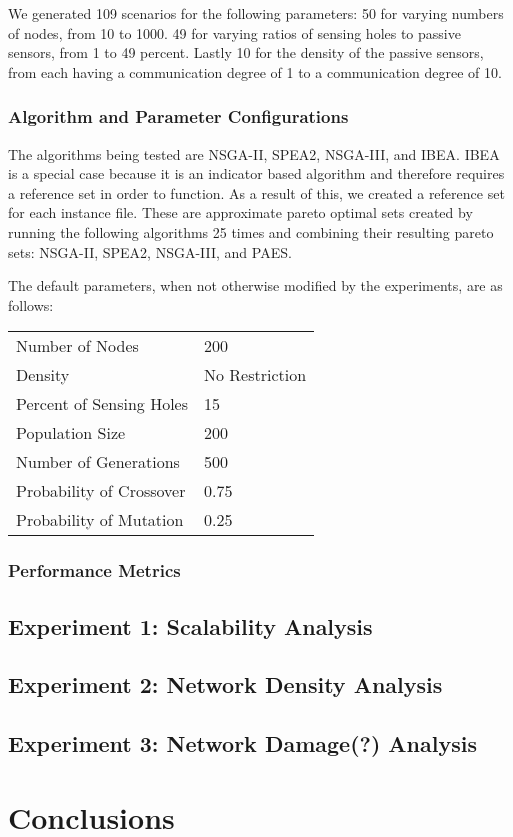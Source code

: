 \documentclass[conference]{IEEEtran}
\begin{document}
We generated 109 scenarios for the following parameters: 50 for varying numbers of nodes, from 10 to 1000. 49 for varying ratios of sensing holes to passive sensors, from 1 to 49 percent. Lastly 10 for the density of the passive sensors, from each having a communication degree of 1 to a communication degree of 10.

\subsubsection{Algorithm and Parameter Configurations}
\label{sec:Simulations:AlgorithmsAndParameters}
The algorithms being tested are NSGA-II\cite{Deb2002:NSGA-II}, SPEA2\cite{zitzler2001spea2}, NSGA-III\cite{6600851}, and IBEA\cite{zitzler2004indicator}. IBEA is a special case because it is an indicator based algorithm and therefore requires a reference set in order to function. As a result of this, we created a reference set for each instance file. These are approximate pareto optimal sets created by running the following algorithms 25 times and combining their resulting pareto sets: NSGA-II, SPEA2,  NSGA-III, and PAES\cite{knowles2000approximating}.

The default parameters, when not otherwise modified by the experiments, are as follows: 
\begin{table}[h]
\begin{tabular}{ll}
Number of Nodes &	200 \\
Density &  No Restriction \\
Percent of Sensing Holes & 15 \\
Population Size & 200 \\
Number of Generations &  500 \\
Probability of Crossover & 0.75 \\ 
Probability of Mutation & 0.25 \\
\end{tabular}
\end{table}

\subsubsection{Performance Metrics}
\label{sec:Experiments:Metrics}

\subsection{Experiment 1: Scalability Analysis}
\label{sec:Simulations:Experiment1}

\subsection{Experiment 2: Network Density Analysis}
\label{sec:Simulations:Experiment2}

\subsection{Experiment 3: Network Damage(?) Analysis}
\label{sec:Simulations:Experiment3}


\section{Conclusions}
\label{sec:Conclusions}




\end{document}
